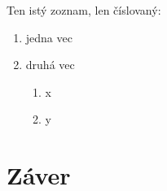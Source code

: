 \documentclass[10pt,twoside,slovak,a4paper]{article}
\begin{document}
Ten istý zoznam, len číslovaný:

\begin{enumerate}
\item jedna vec
\item druhá vec
	\begin{enumerate}
	\item x
	\item y
	\end{enumerate}
\end{enumerate}






\section{Záver} \label{zaver} %






\end{document}
